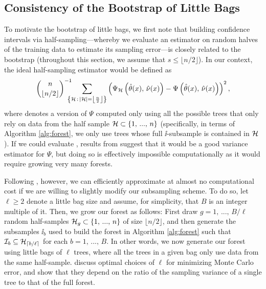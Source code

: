 \documentclass[aos]{imsart}
\theoremstyle{plain}
\theoremstyle{definition}
\theoremstyle{remark}
\begin{document}
\begin{CJK}{UTF8}{gbsn}
\subsection{Consistency of the Bootstrap of Little Bags}
\label{sec:blb}

To motivate the bootstrap of little bags, we first note that
building confidence intervals via half-sampling---whereby we evaluate an estimator on random
halves of the training data to estimate its sampling error---is closely related to the
bootstrap \citep{efron1982jackknife} (throughout this section, we assume that $s \leq \lfloor n/2 \rfloor$).
In our context, the ideal half-sampling estimator would be  defined as
\begin{equation}
\label{eq:hs_opt}
\binom{n}{\lfloor n/2 \rfloor}^{-1}
\!\!\!\!\!
\sum_{\cb{\hh \, : \, \abs{\hh} = \left\lfloor \frac{n}{2} \right\rfloor}}
\p{\Psi_{\hh}\p{\htheta(x), \, \hnu(x)} - \Psi\p{\htheta(x), \, \hnu(x)}}^2,
\end{equation}
where \smash{$\Psi_{\hh}$} denotes a version of $\Psi$ computed only using all the possible
trees that only rely on data from the half sample $\mathcal{H} \subset \left\{1, \, ..., \, n\right\}$ (specifically, in terms of Algorithm
\ref{alg:forest}, we only use trees whose full $\ii$-subsample is contained in $\mathcal{H}$).
If we could evaluate , results from \citet{efron1982jackknife}
suggest that it would be a good variance estimator for $\Psi$, but doing so is
effectively impossible computationally as it would require growing very many forests.

Following \citet{sexton2009standard}, however, we can efficiently approximate 
at almost no computational cost if we are willing to slightly modify our subsampling scheme.
To do so, let $\ell \geq 2$ denote a little bag size and assume, for simplicity, that $B$ is an integer
multiple of it.
Then, we grow our forest as follows: First draw $g = 1, \, ..., \, B/\ell$ random half-samples
$\mathcal{H}_g \subset \left\{1, \, ..., \, n\right\}$ of size $\lfloor n/2 \rfloor$, and then generate the subsamples
$\ii_b$ used to build the forest in Algorithm \ref{alg:forest} such that $\mathcal{I}_b \subseteq \mathcal{H}_{\lceil b/\ell \rceil}$
for each $b = 1, \, ..., \, B$. In other words, we now generate our forest using little bags of
$\ell$ trees, where all the trees in a given bag only use data from the same half-sample.
\citet{sexton2009standard} discuss optimal choices of $\ell$ for minimizing Monte Carlo error,
and show that they depend on the ratio of the sampling variance of a single tree to that of the full forest.


\end{CJK}
\end{document}
